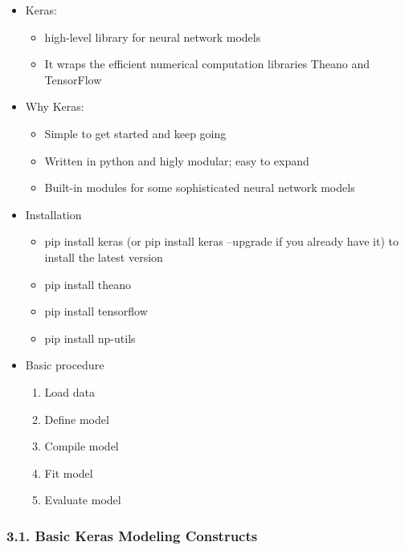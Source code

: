 \documentclass[11pt]{article}
\providecommand{\tightlist}{%
      \setlength{\itemsep}{0pt}\setlength{\parskip}{0pt}}
\begin{document}
\begin{itemize}
\tightlist
\item
  Keras:

  \begin{itemize}
  \tightlist
  \item
    high-level library for neural network models
  \item
    It wraps the efficient numerical computation libraries Theano and
    TensorFlow
  \end{itemize}
\item
  Why Keras:

  \begin{itemize}
  \tightlist
  \item
    Simple to get started and keep going
  \item
    Written in python and higly modular; easy to expand
  \item
    Built-in modules for some sophisticated neural network models
  \end{itemize}
\item
  Installation

  \begin{itemize}
  \tightlist
  \item
    pip install keras (or pip install keras --upgrade if you already
    have it) to install the latest version
  \item
    pip install theano
  \item
    pip install tensorflow
  \item
    pip install np-utils
  \end{itemize}
\item
  Basic procedure

  \begin{enumerate}
  \def\labelenumi{\arabic{enumi}.}
  \tightlist
  \item
    Load data
  \item
    Define model
  \item
    Compile model
  \item
    Fit model
  \item
    Evaluate model
  \end{enumerate}
\end{itemize}

    \hypertarget{basic-keras-modeling-constructs}{%
\subsubsection{3.1. Basic Keras Modeling
Constructs}\label{basic-keras-modeling-constructs}}
\end{document}
